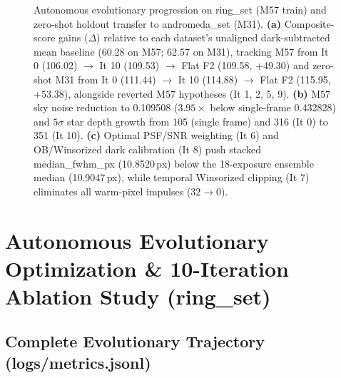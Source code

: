\documentclass[10pt,twocolumn,letterpaper]{article}
\DeclareRobustCommand{\code}[1]{\texttt{#1}}
\def\code#1{#1}%
\begin{document}
\begin{figure}[t]
  \vspace{-0.4em}
  \caption{Autonomous evolutionary progression on \code{ring\_set} (M57 train) and zero-shot holdout transfer to \code{andromeda\_set} (M31). \textbf{(a)} Composite-score gains ($\Delta$) relative to each dataset's unaligned dark-subtracted mean baseline (\code{60.28} on M57; \code{62.57} on M31), tracking M57 from \code{It 0} (\code{106.02}) $\to$ \code{It 10} (\code{109.53}) $\to$ \code{Flat F2} (\code{109.58}, \code{+49.30}) and zero-shot M31 from \code{It 0} (\code{111.44}) $\to$ \code{It 10} (\code{114.88}) $\to$ \code{Flat F2} (\code{115.95}, \code{+53.38}), alongside reverted M57 hypotheses (\code{It 1, 2, 5, 9}). \textbf{(b)} M57 sky noise reduction to \code{0.109508} ($3.95\times$ below single-frame \code{0.432828}) and $5\sigma$ star depth growth from \code{105} (single frame) and \code{316} (\code{It 0}) to \code{351} (\code{It 10}). \textbf{(c)} Optimal PSF/SNR weighting (\code{It 6}) and OB/Winsorized dark calibration (\code{It 8}) push stacked \code{median\_fwhm\_px} (\code{10.8520\,px}) below the 18-exposure ensemble median (\code{10.9047\,px}), while temporal Winsorized clipping (\code{It 7}) eliminates all warm-pixel impulses ($\code{32} \to \code{0}$).}
  \label{fig:evolution}
\end{figure}

\section{Autonomous Evolutionary Optimization \& 10-Iteration Ablation Study (\code{ring\_set})}
\label{sec:ablation}

\subsection{Complete Evolutionary Trajectory (\code{logs/metrics.jsonl})}
\end{document}
